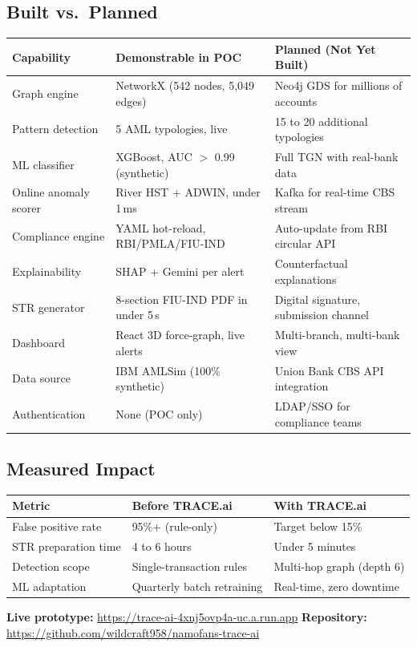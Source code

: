 \documentclass[10pt,a4paper]{article}
\begin{document}
\subsection{Built vs.\ Planned}

\begin{tabularx}{\linewidth}{L{3.8cm} L{4.4cm} X}
\toprule
\textbf{Capability} & \textbf{\color{tracegreen}Demonstrable in POC} & \textbf{\color{traceorange}Planned (Not Yet Built)} \\
\midrule
Graph engine & NetworkX (542 nodes, 5,049 edges) & Neo4j GDS for millions of accounts \\[1pt]
Pattern detection & 5 AML typologies, live & 15 to 20 additional typologies \\[1pt]
ML classifier & XGBoost, AUC $>$ 0.99 (synthetic) & Full TGN with real-bank data \\[1pt]
Online anomaly scorer & River HST + ADWIN, under 1\,ms & Kafka for real-time CBS stream \\[1pt]
Compliance engine & YAML hot-reload, RBI/PMLA/FIU-IND & Auto-update from RBI circular API \\[1pt]
Explainability & SHAP + Gemini per alert & Counterfactual explanations \\[1pt]
STR generator & 8-section FIU-IND PDF in under 5\,s & Digital signature, submission channel \\[1pt]
Dashboard & React 3D force-graph, live alerts & Multi-branch, multi-bank view \\[1pt]
Data source & IBM AMLSim (100\% synthetic) & Union Bank CBS API integration \\[1pt]
Authentication & None (POC only) & LDAP/SSO for compliance teams \\
\bottomrule
\end{tabularx}

\subsection{Measured Impact}

\begin{tabular}{lll}
\toprule
\textbf{Metric} & \textbf{Before TRACE.ai} & \textbf{With TRACE.ai} \\
\midrule
False positive rate & 95\%+ (rule-only) & Target below 15\% \\
STR preparation time & 4 to 6 hours & Under 5 minutes \\
Detection scope & Single-transaction rules & Multi-hop graph (depth 6) \\
ML adaptation & Quarterly batch retraining & Real-time, zero downtime \\
\bottomrule
\end{tabular}

\vspace{4mm}
\noindent\colorbox{traceblue!8}{\parbox{\dimexpr\linewidth-10pt\relax}{\footnotesize\color{traceblue}
\textbf{Live prototype:} \url{https://trace-ai-4xnj5ovp4a-uc.a.run.app} \newline
\textbf{Repository:} \url{https://github.com/wildcraft958/namofans-trace-ai}
}}
\end{document}
